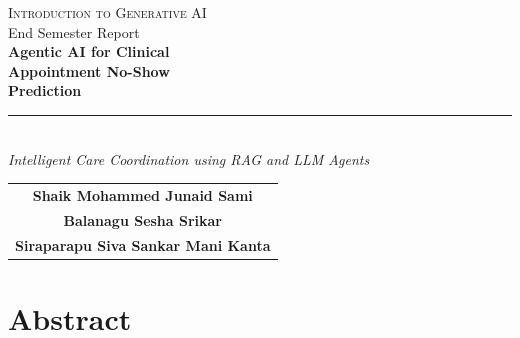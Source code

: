 \documentclass[12pt, a4paper]{report}
\begin{document}
\begin{titlepage}
  \thispagestyle{empty}
  \noindent\makebox[\linewidth]{\color{primaryblue}\rule{\paperwidth}{6pt}}
  \vspace{1.5cm}

  \begin{center}
    {\large\color{accentblue}\textsc{Introduction to Generative AI}}\\[0.4cm]
    {\normalsize\color{darkgray}End Semester Report}\\[1.5cm]

    {\fontsize{28}{34}\selectfont\bfseries\color{primaryblue}
      Agentic AI for Clinical\\[4pt]
      Appointment No-Show\\[4pt]
      Prediction}\\[0.6cm]
    \color{rulecolor}\rule{0.6\linewidth}{1.5pt}\\[0.8cm]

    {\large\color{darkgray}\textit{Intelligent Care Coordination using RAG and LLM Agents}}\\[2.5cm]

    \begin{tabular}{c}
      {\large\bfseries\color{primaryblue} Shaik Mohammed Junaid Sami}\\[10pt]
      {\large\bfseries\color{primaryblue} Balanagu Sesha Srikar}\\[10pt]
      {\large\bfseries\color{primaryblue} Siraparapu Siva Sankar Mani Kanta}
    \end{tabular}
  \end{center}

  \vfill
  \noindent\makebox[\linewidth]{\color{primaryblue}\rule{\paperwidth}{4pt}}
\end{titlepage}

\cleardoublepage
\tableofcontents
\cleardoublepage

\chapter*{Abstract}
\end{document}
